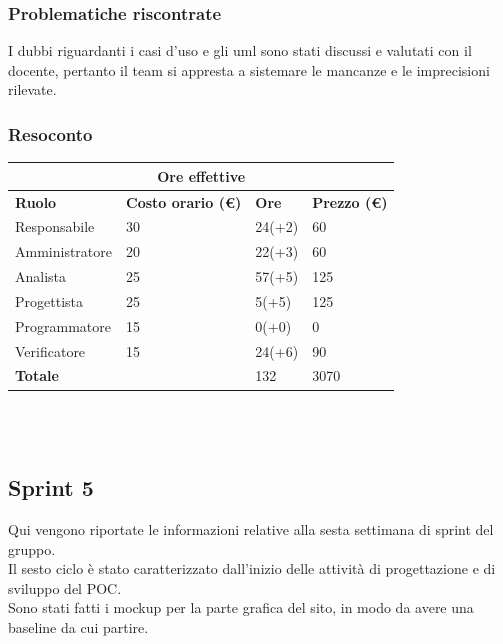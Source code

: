 \documentclass[9pt]{article}
\begin{document}
\subsubsection{Problematiche riscontrate}
I dubbi riguardanti i casi d'uso e gli uml sono stati discussi e valutati con il docente, pertanto il team si appresta a sistemare le mancanze e le imprecisioni rilevate.
\subsubsection{Resoconto}
\begin{center}
	\begin{tabularx}{\textwidth}{|X|X|X|X|}
		\hline
		\multicolumn{4}{|c|}{\textbf{Ore effettive}}                                      \\
		\hline
		\hline
		\textbf{Ruolo}  & \textbf{Costo orario (\euro)} & \textbf{Ore} & \textbf{Prezzo (\euro)} \\
		\hline
		Responsabile    & 30                            & 24(+2)       & 60                      \\
		\hline
		Amministratore  & 20                            & 22(+3)       & 60                      \\
		\hline
		Analista        & 25                            & 57(+5)       & 125                     \\
		\hline
		Progettista     & 25                            & 5(+5)        & 125                     \\
		\hline
		Programmatore   & 15                            & 0(+0)        & 0                       \\
		\hline
		Verificatore    & 15                            & 24(+6)       & 90                      \\
		\hline
		\hline
		\textbf{Totale} &                               & 132          & 3070                    \\
		\hline
	\end{tabularx}\\[8pt]
	\mbox{}\\
\end{center}

\subsection{Sprint 5}
Qui vengono riportate le informazioni relative alla sesta settimana di sprint del gruppo. \\
Il sesto ciclo è stato caratterizzato dall'inizio delle attività di progettazione e di sviluppo del POC. \\
Sono stati fatti i mockup per la parte grafica del sito, in modo da avere una baseline da cui partire.
\end{document}
